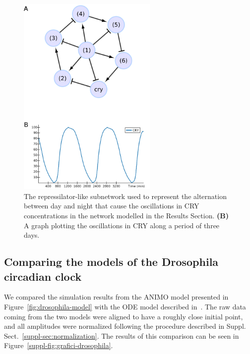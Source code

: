 \documentclass{bmcart}
\begin{document}
\begin{figure}[!htb]
\begin{minipage}{\textwidth}
  \centering
  \includegraphics[width=0.6\textwidth]{images/drosophila_model_repressilator_con_grafico}
\caption{ The repressilator-like subnetwork used to represent the alternation
between day and night that cause the oscillations in {\sf CRY} concentrations in the
network modelled in the Results Section.
{\bf (B)} A graph plotting the oscillations in {\sf CRY} along
a period of three days.}\label{fig:repressilator}
\end{minipage}
\end{figure}


\subsection{Comparing the models of the Drosophila circadian clock}\label{suppl-sec:animo-drosophila}
We compared the simulation results from the ANIMO model presented in Figure~\ref{fig:drosophila-model}
with the ODE model described in~\cite{drosophila-ode-model}. The raw data coming from the
two models were aligned to have a roughly close initial point, and all amplitudes were normalized
following the procedure described in Suppl. Sect.~\ref{suppl-sec:normalization}. The results
of this comparison can be seen in Figure~\ref{suppl-fig:grafici-drosophila}.
\end{document}
